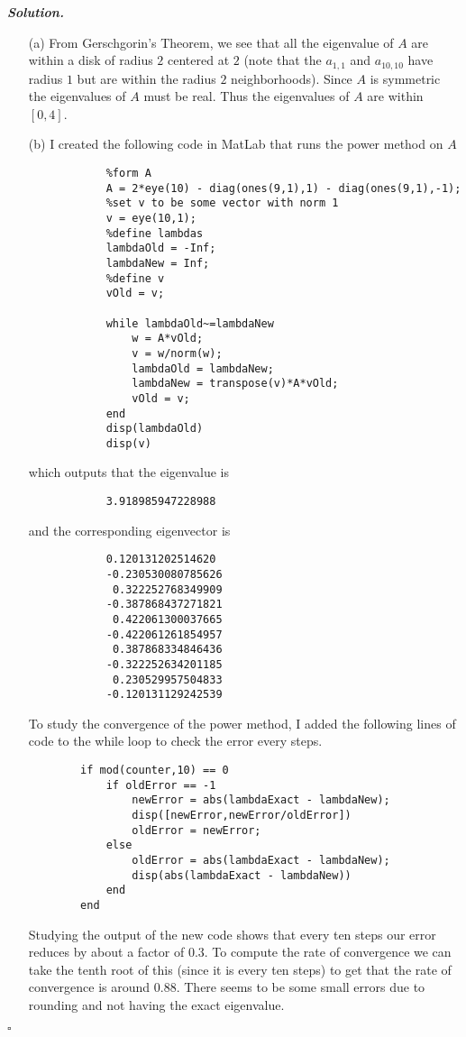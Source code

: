\documentclass[12pt]{report}
\newenvironment{solution}[1][\it{Solution}]{\textbf{#1. } }{$\square$}
\begin{document}
\begin{solution}

    \noindent
    \begin{enumerate}
        \item [(a)]
        From Gerschgorin's Theorem, we see that all the eigenvalue of $A$ are within a disk of radius $2$ centered at $2$ (note that the $a_{1,1}$ and $a_{10,10}$ have radius $1$ but are within the radius $2$ neighborhoods). Since $A$ is symmetric the eigenvalues of $A$ must be real. Thus the eigenvalues of $A$ are within $[0,4]$.  
        
        \item [(b)]
        I created the following code in MatLab that runs the power method on $A$
        \begin{verbatim}
            %form A
            A = 2*eye(10) - diag(ones(9,1),1) - diag(ones(9,1),-1);
            %set v to be some vector with norm 1
            v = eye(10,1);
            %define lambdas
            lambdaOld = -Inf;
            lambdaNew = Inf;
            %define v
            vOld = v;

            while lambdaOld~=lambdaNew
                w = A*vOld;
                v = w/norm(w);
                lambdaOld = lambdaNew;
                lambdaNew = transpose(v)*A*vOld;
                vOld = v;
            end
            disp(lambdaOld)
            disp(v)
        \end{verbatim}
        which outputs that the eigenvalue is 
        \begin{verbatim}
            3.918985947228988
        \end{verbatim}
        and the corresponding eigenvector is
        \begin{verbatim}
            0.120131202514620
            -0.230530080785626
             0.322252768349909
            -0.387868437271821
             0.422061300037665
            -0.422061261854957
             0.387868334846436
            -0.322252634201185
             0.230529957504833
            -0.120131129242539          
        \end{verbatim}
        To study the convergence of the power method, I added the following lines of code to the while loop to check the error every steps.
        \begin{verbatim}
        if mod(counter,10) == 0
            if oldError == -1
                newError = abs(lambdaExact - lambdaNew);
                disp([newError,newError/oldError])
                oldError = newError;
            else
                oldError = abs(lambdaExact - lambdaNew);
                disp(abs(lambdaExact - lambdaNew))
            end
        end
        \end{verbatim}
        Studying the output of the new code shows that every ten steps our error reduces by about a factor of $0.3$. To compute the rate of convergence we can take the tenth root of this (since it is every ten steps) to get that the rate of convergence is around $0.88$. There seems to be some small errors due to rounding and not having the exact eigenvalue.



\end{enumerate}
\end{solution}
\end{document}
